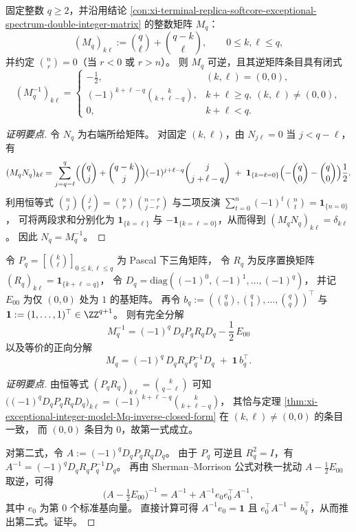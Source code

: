 \begin{theorem}\label{thm:xi-exceptional-integer-model-Mq-inverse-closed-form}
固定整数 \(q\ge 2\)，并沿用结论 \ref{con:xi-terminal-replica-softcore-exceptional-spectrum-double-integer-matrix} 的整数矩阵 \(M_q\)：
\[
(M_q)_{k\ell}:=\binom{q}{\ell}+\binom{q-k}{\ell},\qquad 0\le k,\ell\le q,
\]
并约定 \(\binom{n}{r}=0\)（当 \(r<0\) 或 \(r>n\)）。
则 \(M_q\) 可逆，且其逆矩阵条目具有闭式
\[
\boxed{\;
(M_q^{-1})_{k\ell}=
\begin{cases}
-\frac12, & (k,\ell)=(0,0),\\[4pt]
(-1)^{k+\ell-q}\binom{k}{k+\ell-q}, & k+\ell\ge q,\ (k,\ell)\neq(0,0),\\[4pt]
0, & k+\ell<q.
\end{cases}\;}
\]
\end{theorem}
\begin{proof}[证明要点]
令 \(N_q\) 为右端所给矩阵。
对固定 \((k,\ell)\)，由 \(N_{j\ell}=0\) 当 \(j<q-\ell\)，有
\[
(M_qN_q)_{k\ell}
=\sum_{j=q-\ell}^{q}\Bigl(\binom{q}{j}+\binom{q-k}{j}\Bigr)(-1)^{j+\ell-q}\binom{j}{j+\ell-q}
\;+\;\mathbf 1_{\{k=\ell=0\}}\Bigl(-\binom{q}{0}-\binom{q}{0}\Bigr)\frac12.
\]
利用恒等式 \(\binom{n}{j}\binom{j}{r}=\binom{n}{r}\binom{n-r}{j-r}\) 与二项反演
\(\sum_{t=0}^{n}(-1)^t\binom{n}{t}=\mathbf 1_{\{n=0\}}\)，
可将两段求和分别化为 \(\mathbf 1_{\{k=\ell\}}\) 与 \(-\mathbf 1_{\{k=\ell=0\}}\)，从而得到
\((M_qN_q)_{k\ell}=\delta_{k\ell}\)。
因此 \(N_q=M_q^{-1}\)。
\end{proof}

\begin{proposition}\label{prop:xi-exceptional-integer-model-Mq-rank1-decomposition}
令 \(P_q=[\binom{k}{\ell}]_{0\le k,\ell\le q}\) 为 Pascal 下三角矩阵，
令 \(R_q\) 为反序置换矩阵 \((R_q)_{k\ell}=\mathbf 1_{\{k+\ell=q\}}\)，
令 \(D_q=\mathrm{diag}(({-1})^{0},({-1})^{1},\dots,({-1})^{q})\)，
并记 \(E_{00}\) 为仅 \((0,0)\) 处为 \(1\) 的基矩阵。
再令 \(b_q:=(\binom{q}{0},\binom{q}{1},\dots,\binom{q}{q})^{\top}\) 与 \(\mathbf 1:=(1,\dots,1)^{\top}\in\ZZ^{q+1}\)。
则有完全分解
\[
\boxed{\;
M_q^{-1}=(-1)^q\,D_qP_qR_qD_q-\frac12\,E_{00}\;}
\]
以及等价的正向分解
\[
\boxed{\;
M_q=(-1)^q\,D_qR_qP_q^{-1}D_q\;+\;\mathbf 1\,b_q^{\top}.\;}
\]
\end{proposition}
\begin{proof}[证明要点]
由恒等式 \((P_qR_q)_{k\ell}=\binom{k}{q-\ell}\) 可知
\(\bigl(({-1})^qD_qP_qR_qD_q\bigr)_{k\ell}=(-1)^{k+\ell-q}\binom{k}{k+\ell-q}\)，
其恰与定理 \ref{thm:xi-exceptional-integer-model-Mq-inverse-closed-form} 在 \((k,\ell)\neq(0,0)\) 的条目一致，
而 \((0,0)\) 条目为 \(0\)，故第一式成立。
\par
对第二式，令 \(A:=(-1)^qD_qP_qR_qD_q\)。
由于 \(P_q\) 可逆且 \(R_q^2=I\)，有
\(
A^{-1}=(-1)^qD_qR_qP_q^{-1}D_q
\)。
再由 Sherman--Morrison 公式对秩一扰动 \(A-\frac12E_{00}\) 取逆，可得
\[
\bigl(A-\tfrac12E_{00}\bigr)^{-1}=A^{-1}+A^{-1}e_0e_0^{\top}A^{-1},
\]
其中 \(e_0\) 为第 \(0\) 个标准基向量。
直接计算可得 \(A^{-1}e_0=\mathbf 1\) 且 \(e_0^{\top}A^{-1}=b_q^{\top}\)，从而推出第二式。证毕。
\end{proof}

